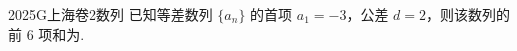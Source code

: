 
\begin{problem}{2025}{G}{上海卷}{2}{数列}
已知等差数列 $\{a_n\}$ 的首项 $a_1=-3$，公差 $d=2$，则该数列的前 6 项和为\underline{\hspace{4em}}.
\end{problem}